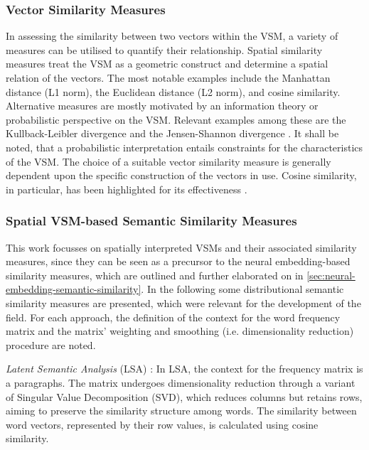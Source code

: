 \documentclass[11pt]{scrreprt}
\let\cite\parencite  %
\begin{document}
\subsubsection{Vector Similarity Measures}
In assessing the similarity between two vectors within the VSM, a variety of measures can be utilised to quantify their relationship. Spatial similarity measures treat the VSM as a geometric construct and determine a spatial relation of the vectors. The most notable examples include the Manhattan distance (L1 norm), the Euclidean distance (L2 norm), and cosine similarity. Alternative measures are mostly motivated by an information theory or probabilistic perspective on the VSM. Relevant examples among these are the Kullback-Leibler divergence and the Jensen-Shannon divergence \cite{mohammadDistributionalMeasuresSemantic2012a, mohammadDistributionalMeasuresSemantic2012}. It shall be noted, that a probabilistic interpretation entails constraints for the characteristics of the VSM. The choice of a suitable vector similarity measure is generally dependent upon the specific construction of the vectors in use. Cosine similarity, in particular, has been highlighted for its effectiveness \cite{mohammadDistributionalMeasuresProxies2012, turneyFrequencyMeaningVector2010}. 

\subsubsection{Spatial VSM-based Semantic Similarity Measures}
This work focusses on spatially interpreted VSMs and their associated similarity measures, since they can be seen as a precursor to the neural embedding-based similarity measures, which are outlined and further elaborated on in \cref{sec:neural-embedding-semantic-similarity}.
In the following some distributional semantic similarity measures are presented, which were relevant for the development of the field. For each approach, the definition of the context for the word frequency matrix and the matrix' weighting and smoothing  (i.e. dimensionality reduction) procedure are noted. 

\textit{Latent Semantic Analysis} (LSA) \cite{deerwesterIndexingLatentSemantic1990, landauerSolutionPlatoProblem1997, landauerIntroductionLatentSemantic1998}: In LSA, the context for the frequency matrix is a paragraphs. The matrix undergoes dimensionality reduction through a variant of Singular Value Decomposition (SVD), which reduces columns but retains rows, aiming to preserve the similarity structure among words. The similarity between word vectors, represented by their row values, is calculated using cosine similarity.
\end{document}
